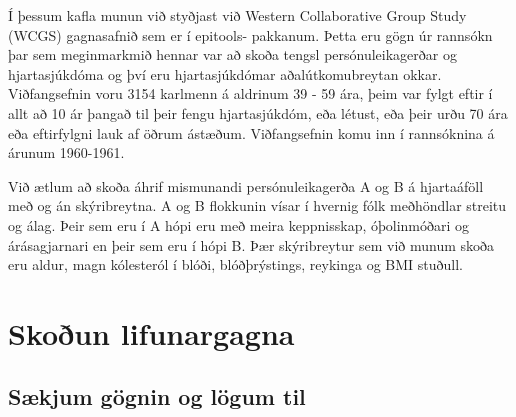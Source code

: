 \documentclass[
]{book}
\begin{document}
Í þessum kafla munun við styðjast við Western Collaborative Group Study (WCGS) gagnasafnið sem er í epitools- pakkanum. Þetta eru gögn úr rannsókn þar sem meginmarkmið hennar var að skoða tengsl persónuleikagerðar og hjartasjúkdóma og því eru hjartasjúkdómar aðalútkomubreytan okkar. Viðfangsefnin voru 3154 karlmenn á aldrinum 39 - 59 ára, þeim var fylgt eftir í allt að 10 ár þangað til þeir fengu hjartasjúkdóm, eða létust, eða þeir urðu 70 ára eða eftirfylgni lauk af öðrum ástæðum. Viðfangsefnin komu inn í rannsóknina á árunum 1960-1961.

Við ætlum að skoða áhrif mismunandi persónuleikagerða A og B á hjartaáföll með og án skýribreytna. A og B flokkunin vísar í hvernig fólk meðhöndlar streitu og álag. Þeir sem eru í A hópi eru með meira keppnisskap, óþolinmóðari og árásagjarnari en þeir sem eru í hópi B. Þær skýribreytur sem við munum skoða eru aldur, magn kólesteról í blóði, blóðþrýstings, reykinga og BMI stuðull.

\hypertarget{lif_skod}{%
\section{Skoðun lifunargagna}\label{lif_skod}}

\hypertarget{suxe6kjum-guxf6gnin-og-luxf6gum-til}{%
\subsection{Sækjum gögnin og lögum til}\label{suxe6kjum-guxf6gnin-og-luxf6gum-til}}
\end{document}
